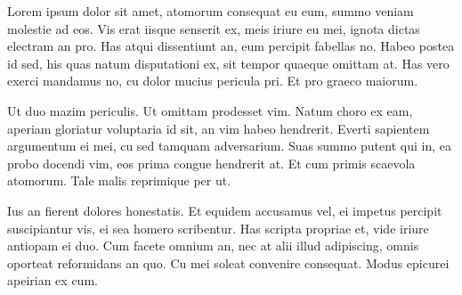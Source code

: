 \documentclass{article}
\begin{document}
Lorem ipsum dolor sit amet, atomorum consequat eu eum, summo veniam
molestie ad eos. Vis erat iisque senserit ex, meis iriure eu mei,
ignota dictas electram an pro. Has atqui dissentiunt an, eum percipit
fabellas no. Habeo postea id sed, his quas natum disputationi ex, sit
tempor quaeque omittam at. Has vero exerci mandamus no, cu dolor
mucius pericula pri. Et pro graeco maiorum.

Ut duo mazim periculis. Ut omittam prodesset vim. Natum choro ex eam,
aperiam gloriatur voluptaria id sit, an vim habeo hendrerit. Everti
sapientem argumentum ei mei, cu sed tamquam adversarium. Suas summo
putent qui in, ea probo docendi vim, eos prima congue hendrerit at.
Et cum primis scaevola atomorum. Tale malis reprimique per ut.

Ius an fierent dolores honestatis. Et equidem accusamus vel, ei
impetus percipit suscipiantur vis, ei sea homero scribentur. Has
scripta propriae et, vide iriure antiopam ei duo. Cum facete omnium
an, nec at alii illud adipiscing, omnis oporteat reformidans an quo.
Cu mei soleat convenire consequat. Modus epicurei apeirian ex cum.
\end{document}
